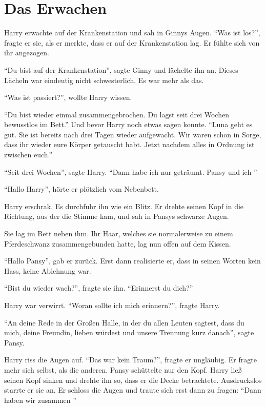 \chapter{Das Erwachen}


Harry erwachte auf der Krankenstation und sah in Ginnys Augen. \enquote{Was ist los?}, fragte er sie, als er merkte, dass er auf der Krankenstation lag. Er fühlte sich von ihr angezogen.

\enquote{Du bist auf der Krankenstation}, sagte Ginny und lächelte ihn an. Dieses Lächeln war eindeutig nicht schwesterlich. Es war mehr als das.

\enquote{Was ist passiert?}, wollte Harry wissen.

\enquote{Du bist wieder einmal zusammengebrochen. Du lagst seit drei Wochen bewusstlos im Bett.} Und bevor Harry noch etwas sagen konnte. \enquote{Luna geht es gut. Sie ist bereits nach drei Tagen wieder aufgewacht. Wir waren schon in Sorge, dass ihr wieder eure Körper getauscht habt. Jetzt nachdem alles in Ordnung ist zwischen euch.}

\enquote{Seit drei Wochen}, sagte Harry. \enquote{Dann habe ich nur geträumt. Pansy und ich \gst}

\enquote{Hallo Harry}, hörte er plötzlich vom Nebenbett.

Harry erschrak. Es durchfuhr ihn wie ein Blitz.  Er drehte seinen Kopf in die Richtung, aus der die Stimme kam, und sah in Pansys schwarze Augen.

Sie lag im Bett neben ihm. Ihr Haar, welches sie normalerweise zu einem Pferdeschwanz zusammengebunden hatte, lag nun offen auf dem Kissen.

\enquote{Hallo Pansy}, gab er zurück. Erst dann realisierte er, dass in seinen Worten kein Hass, keine Ablehnung war.

\enquote{Bist du wieder wach?}, fragte sie ihn. \enquote{Erinnerst du dich?}

Harry war verwirrt. \enquote{Woran sollte ich mich erinnern?}, fragte Harry.

\enquote{An deine Rede in der Großen Halle, in der du allen Leuten sagtest, dass du mich, deine Freundin, lieben würdest und unsere Trennung kurz danach}, sagte Pansy.

Harry riss die Augen auf. \enquote{Das war kein Traum?}, fragte er ungläubig. Er fragte mehr sich selbst, als die anderen. Pansy schüttelte nur den Kopf. Harry ließ seinen Kopf sinken und drehte ihn so, dass er die Decke betrachtete. Ausdruckslos starrte er sie an. Er schloss die Augen und traute sich erst dann zu fragen: \enquote{Dann haben wir zusammen \gst}

